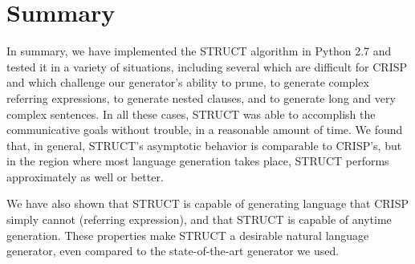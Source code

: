 \section{Summary}

In summary, we have implemented the STRUCT algorithm in Python 2.7 and tested
it in a variety of situations, including several which are difficult for CRISP and which
challenge our generator's ability to prune, to generate complex referring expressions,
to generate nested clauses, and to generate long and very complex sentences.
In all these cases, STRUCT was able to accomplish the communicative
goals without trouble, in a reasonable amount of time.  We found that, in general,
STRUCT's asymptotic behavior is comparable to CRISP's, but in the region
where most language generation takes place, STRUCT performs approximately as well
or better.

We have also shown that STRUCT is capable of generating language that CRISP simply
cannot (referring expression), and that STRUCT is capable of anytime generation.
These properties make STRUCT a desirable natural language generator, even
compared to the state-of-the-art generator we used.